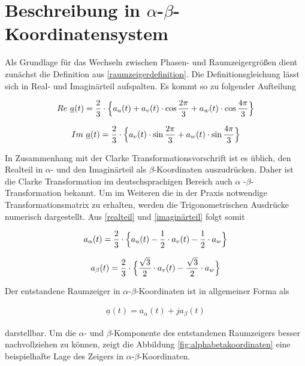 \section{Beschreibung in $\alpha$-$\beta$-Koordinatensystem}\label{sec:clark}

Als Grundlage für das Wechseln zwischen Phasen- und Raumzeigergrößen dient zunächst die Definition aus \ref{raumzeigerdefinition}. Die Definitionsgleichung lässt sich in Real- und Imaginärteil aufspalten. Es kommt so zu folgender Aufteilung

\begin{align}
	Re~{\underline{a}(t)} = \frac{2}{3} \cdot \Bigl\{ a_{u}(t) + a_{v}(t) \cdot\cos{\frac{2 \pi}{3}} + a_{w}(t) \cdot\cos{\frac{4 \pi}{3}} \Bigr\}
	\label{realteil}
\end{align}

\begin{align}
	Im~{\underline{a}(t)} = \frac{2}{3} \cdot \Bigl\{a_{v}(t)\cdot\sin{\frac{2 \pi}{3}} + a_{w}(t) \cdot\sin{\frac{4 \pi}{3}} \Bigr\}
	\label{imaginärteil}
\end{align}

In Zusammenhang mit der Clarke Transformationsvorschrift ist es üblich, den Realteil in $\alpha$- und den Imaginärteil als $\beta$-Koordinaten auszudrücken. 
Daher ist die Clarke Transformation im deutschsprachigen Bereich auch $\alpha$ -$\beta$-Transformation bekannt.
Um im Weiteren die in der Praxis notwendige Transformationsmatrix zu erhalten, werden die Trigonometrischen Ausdrücke numerisch dargestellt. 
Aus \ref{realteil} und \ref{imaginärteil} folgt somit

\begin{align}
	a_{\alpha}(t) = \frac{2}{3} \cdot \Bigl\{ a_{u}(t) - \frac{1}{2} \cdot a_{v}(t) - \frac{1}{2} \cdot a_{w}  \Bigr\}
	\label{alpha}
\end{align}

\begin{align}
	a_{\beta}(t) = \frac{2}{3} \cdot \Bigl\{\frac{\sqrt{3}}{2} \cdot a_{v}(t) - \frac{\sqrt{3}}{2} \cdot a_{w}  \Bigr\}
	\label{beta}
\end{align}

Der entstandene Raumzeiger in  $\alpha$-$\beta$-Koordinaten ist in allgemeiner Forma als 

\begin{align}
	\underline{a}(t) = a_{\alpha}(t) +j a_{\beta}(t)
	\label{raumzeigeralphabeta}
\end{align}

darstellbar. Um die $\alpha$- und $\beta$-Komponente des entstandenen Raumzeigers besser nachvollziehen zu können, zeigt die Abbildung \ref{fig:alphabetakoordinaten} eine beispielhafte Lage des Zeigers in $\alpha$-$\beta$-Koordinaten.

